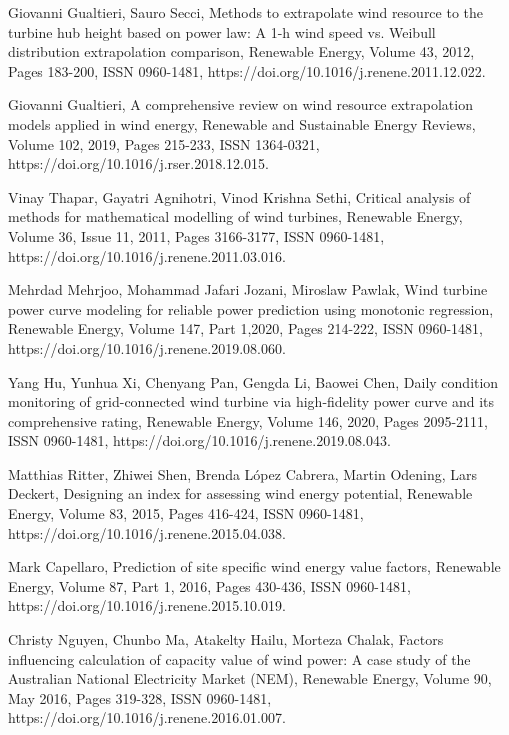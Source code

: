 \begin{thebibliography}{99}
\begin{singlespace}
 Giovanni Gualtieri, Sauro Secci, Methods to extrapolate wind resource to the turbine hub height based on power law: A 1-h wind speed vs. Weibull distribution extrapolation comparison, Renewable Energy, Volume 43, 2012, Pages 183-200, ISSN 0960-1481, https://doi.org/10.1016/j.renene.2011.12.022.

 Giovanni Gualtieri, A comprehensive review on wind resource extrapolation models applied in wind energy, Renewable and Sustainable Energy Reviews, Volume 102, 2019, Pages 215-233, ISSN 1364-0321, https://doi.org/10.1016/j.rser.2018.12.015. 

Vinay Thapar, Gayatri Agnihotri, Vinod Krishna Sethi, Critical analysis of methods for mathematical modelling of wind turbines, Renewable Energy, Volume 36, Issue 11, 2011, Pages 3166-3177, ISSN 0960-1481, https://doi.org/10.1016/j.renene.2011.03.016.

 Mehrdad Mehrjoo, Mohammad Jafari Jozani, Miroslaw Pawlak, Wind turbine power curve modeling for reliable power prediction using monotonic regression, Renewable Energy, Volume 147, Part 1,2020, Pages 214-222, ISSN 0960-1481, \\ https://doi.org/10.1016/j.renene.2019.08.060.

 Yang Hu, Yunhua Xi, Chenyang Pan, Gengda Li, Baowei Chen, Daily condition monitoring of grid-connected wind turbine via high-fidelity power curve and its comprehensive rating, Renewable Energy, Volume 146, 2020, Pages 2095-2111, ISSN 0960-1481, https://doi.org/10.1016/j.renene.2019.08.043.

 Matthias Ritter, Zhiwei Shen, Brenda López Cabrera, Martin Odening, Lars Deckert, Designing an index for assessing wind energy potential, Renewable Energy, Volume 83, 2015, Pages 416-424, ISSN 0960-1481, https://doi.org/10.1016/j.renene.2015.04.038.

 Mark Capellaro, Prediction of site specific wind energy value factors, Renewable Energy, Volume 87, Part 1, 2016, Pages 430-436, ISSN 0960-1481, https://doi.org/10.1016/j.renene.2015.10.019.

 Christy Nguyen, Chunbo Ma, Atakelty Hailu, Morteza Chalak, Factors influencing calculation of capacity value of wind power: A case study of the Australian National Electricity Market (NEM), Renewable Energy, Volume 90, May 2016, Pages 319-328, ISSN 0960-1481, https://doi.org/10.1016/j.renene.2016.01.007.


\end{singlespace}
\end{thebibliography}
